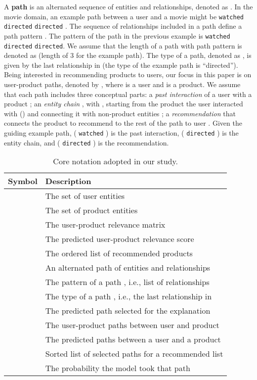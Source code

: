 \documentclass[sigconf]{acmart}
\begin{document}
A \textbf{path} is an alternated sequence of entities and relationships, denoted as . 
In the movie domain, an example path between a user and a movie might be  \texttt{watched}  \texttt{directed}  \texttt{directed} . 
The sequence of relationships included in a path define a path pattern .
The pattern of the path in the previous example is \texttt{watched}  \texttt{directed}  \texttt{directed}. 
We assume that the length of a path  with path pattern  is denoted as  (length of 3 for the example path).
The type of a path, denoted as , is given by the last relationship  in  (the type of the example path is ``directed''). 
Being interested in recommending products to users, our focus in this paper is on user-product paths, denoted by , where  is a user and  is a product. 
We assume that each path  includes three conceptual parts: a \textit{past interaction}  of a user  with a product ; 
an \textit{entity chain} , with , starting from the product  the user interacted with () and connecting it with non-product entities ; 
a \textit{recommendation}  that connects the product  to recommend to the rest of the path to user .
Given the guiding example path, ( \texttt{watched} ) is the past interaction, ( \texttt{directed} ) is the entity chain, and ( \texttt{directed} ) is the recommendation. 

\begin{table}[!t]
  \caption{Core notation adopted in our study.}
  \vspace{-4mm}
  \label{tab:table-of-notation}
  \begin{tabular}{ll}
    \toprule
    \textbf{Symbol} & \textbf{Description} \\
    \hline
    \midrule
     & The set of user entities \\
     & The set of product entities \\
     & The user-product relevance matrix\\
     & The predicted user-product relevance score\\
     & The ordered list of recommended products\\
    \hline 
     & An alternated path of entities and relationships\\
     & The pattern of a path , i.e., list of relationships\\
     & The type of a path , i.e., the last relationship in \\
     & The predicted path selected for the explanation\\
    \hline 
     & The user-product paths between user and product\\
     & The predicted paths between a user and a product\\
     & Sorted list of selected paths for a recommended list\\
     & The probability the model took that path \\
    \bottomrule
  \end{tabular}
\end{table}
\end{document}
